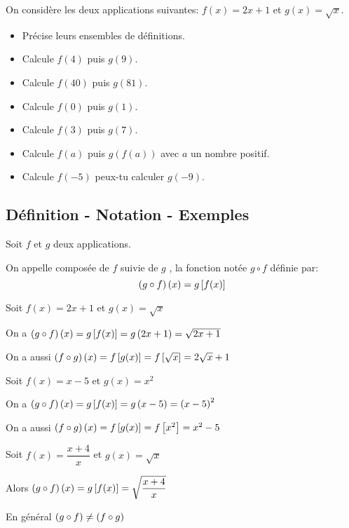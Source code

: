


  
   \begin{lemma}
    On considère les deux applications suivantes: $ f(x)=2x+1 $  et  $ g(x)=\sqrt{x} $.
  \begin{itemize}
\item  Précise leurs ensembles de définitions.
 \item Calcule $ f(4) $  puis $ g(9) $.
 \item Calcule $ f(40) $  puis $ g(81) $.
 \item Calcule $ f(0) $  puis $ g(1) $.
 \item Calcule $ f(3) $  puis $ g(7) $.
 \item Calcule $ f(a) $  puis $ g(f(a)) $  avec $ a $ un nombre positif.
 \item Calcule $ f(-5) $  peux-tu calculer $ g(-9)$.
 \end{itemize}
 \end{lemma}
\subsection*{Définition - Notation - Exemples}

  \begin{definition}
  Soit $f $ et $g$  deux applications.
 
 On appelle composée de $ f $ suivie de $ g $ , la fonction notée $ g\circ f $ définie par:
  \[\left(g\circ f\right)(x)=g\left[ f(x) \right]\]
 \end{definition}
 
  \begin{example}
  Soit $ f(x)= 2x+1 $  et $ g(x)=\sqrt{x} $

 
 On a $ \left(g\circ f\right)(x)=g\left[ f(x) \right]= g\left(2x+1\right)=\sqrt{2x+1} $
 


  On a aussi $ \left(f\circ g\right)(x)=f\left[ g(x) \right]= f\left[ \sqrt{x} \right]=2\sqrt{x}+1 $
  \end{example}

  \begin{example}
 
 Soit $ f(x)= x-5 $  et $ g(x)=x^{2} $
 
 
 On a $ \left(g\circ f\right)(x)=g\left[ f(x) \right]= g\left(x-5\right)=\left(x-5\right)^{2} $
 


  On a aussi $ \left(f\circ g\right)(x)=f\left[ g(x) \right]= f\left[ x^{2} \right]=x^{2}-5 $
 \end{example}

 
 \begin{example}
 
 Soit $ f(x)= \dfrac{x+4}{x} $  et $ g(x)=\sqrt{x} $

Alors \;  $ \left(g\circ f\right)(x)=g\left[ f(x) \right]= \sqrt{\dfrac{x+4}{x}} $
  \end{example}
 
 \begin{remark}
  En général $ \left(g\circ f\right) \neq  \left(f\circ g\right)$
 \end{remark}
 

